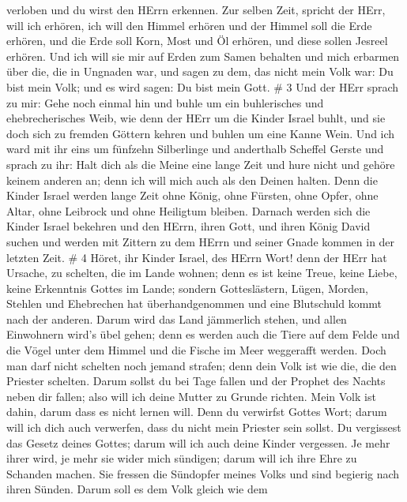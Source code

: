 verloben und du wirst den HErrn erkennen.  Zur selben Zeit,
spricht der HErr, will ich erhören, ich will den Himmel erhören und der
Himmel soll die Erde erhören,  und die Erde soll Korn, Most
und Öl erhören, und diese sollen Jesreel erhören.  Und ich
will sie mir auf Erden zum Samen behalten und mich erbarmen über die,
die in Ungnaden war, und sagen zu dem, das nicht mein Volk war: Du bist
mein Volk; und es wird sagen: Du bist mein Gott. \# 3  Und
der HErr sprach zu mir: Gehe noch einmal hin und buhle um ein
buhlerisches und ehebrecherisches Weib, wie denn der HErr um die Kinder
Israel buhlt, und sie doch sich zu fremden Göttern kehren und buhlen um
eine Kanne Wein.  Und ich ward mit ihr eins um fünfzehn
Silberlinge und anderthalb Scheffel Gerste  und sprach zu
ihr: Halt dich als die Meine eine lange Zeit und hure nicht und gehöre
keinem anderen an; denn ich will mich auch als den Deinen halten.
 Denn die Kinder Israel werden lange Zeit ohne König, ohne
Fürsten, ohne Opfer, ohne Altar, ohne Leibrock und ohne Heiligtum
bleiben.  Darnach werden sich die Kinder Israel bekehren und
den HErrn, ihren Gott, und ihren König David suchen und werden mit
Zittern zu dem HErrn und seiner Gnade kommen in der letzten Zeit. \# 4
 Höret, ihr Kinder Israel, des HErrn Wort! denn der HErr hat
Ursache, zu schelten, die im Lande wohnen; denn es ist keine Treue,
keine Liebe, keine Erkenntnis Gottes im Lande;  sondern
Gotteslästern, Lügen, Morden, Stehlen und Ehebrechen hat
überhandgenommen und eine Blutschuld kommt nach der anderen.
 Darum wird das Land jämmerlich stehen, und allen Einwohnern
wird's übel gehen; denn es werden auch die Tiere auf dem Felde und die
Vögel unter dem Himmel und die Fische im Meer weggerafft werden.
 Doch man darf nicht schelten noch jemand strafen; denn dein
Volk ist wie die, die den Priester schelten.  Darum sollst
du bei Tage fallen und der Prophet des Nachts neben dir fallen; also
will ich deine Mutter zu Grunde richten.  Mein Volk ist
dahin, darum dass es nicht lernen will. Denn du verwirfst Gottes Wort;
darum will ich dich auch verwerfen, dass du nicht mein Priester sein
sollst. Du vergissest das Gesetz deines Gottes; darum will ich auch
deine Kinder vergessen.  Je mehr ihrer wird, je mehr sie
wider mich sündigen; darum will ich ihre Ehre zu Schanden machen.
 Sie fressen die Sündopfer meines Volks und sind begierig
nach ihren Sünden.  Darum soll es dem Volk gleich wie dem
